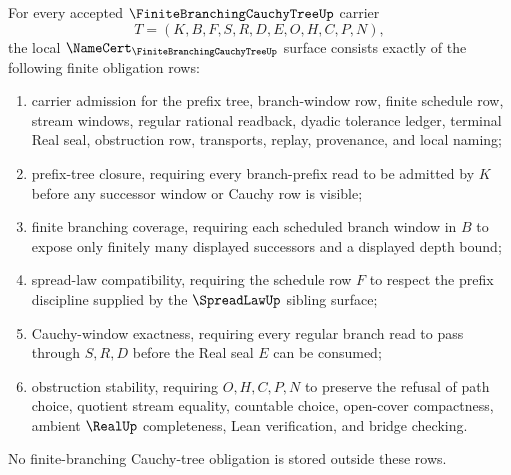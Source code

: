 \begin{theorem}
\label{thm:finite-branching-cauchy-tree-namecert-obligations}
For every accepted $\FiniteBranchingCauchyTreeUp$ carrier
$$
T=(K,B,F,S,R,D,E,O,H,C,P,N),
$$
the local $\NameCert_{\FiniteBranchingCauchyTreeUp}$ surface consists exactly of the following finite obligation rows:
\begin{enumerate}
\item carrier admission for the prefix tree, branch-window row, finite schedule row, stream windows, regular rational readback, dyadic tolerance ledger, terminal Real seal, obstruction row, transports, replay, provenance, and local naming;
\item prefix-tree closure, requiring every branch-prefix read to be admitted by $K$ before any successor window or Cauchy row is visible;
\item finite branching coverage, requiring each scheduled branch window in $B$ to expose only finitely many displayed successors and a displayed depth bound;
\item spread-law compatibility, requiring the schedule row $F$ to respect the prefix discipline supplied by the $\SpreadLawUp$ sibling surface;
\item Cauchy-window exactness, requiring every regular branch read to pass through $S,R,D$ before the Real seal $E$ can be consumed;
\item obstruction stability, requiring $O,H,C,P,N$ to preserve the refusal of path choice, quotient stream equality, countable choice, open-cover compactness, ambient $\RealUp$ completeness, Lean verification, and bridge checking.
\end{enumerate}
No finite-branching Cauchy-tree obligation is stored outside these rows.
\end{theorem}
